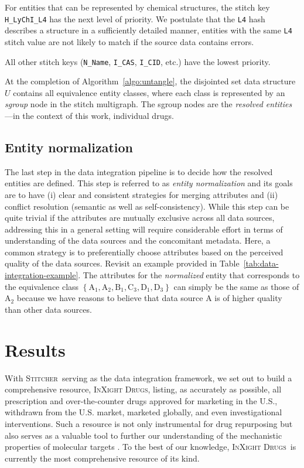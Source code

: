 \documentclass{bmcart}
\newcommand\st{\textsc{Stitcher}}
\newcommand\ix{\textsc{InXight Drugs}}
\begin{document}
For entities that can be represented by chemical structures, the
stitch key \texttt{H\_LyChI\_L4} has the next level of priority. We
postulate that the \texttt{L4} hash describes a structure in a
sufficiently detailed manner, entities with the same \texttt{L4}
stitch value are not likely to match if the source data contains
errors. 

All other stitch keys (\texttt{N\_Name}, \texttt{I\_CAS},
\texttt{I\_CID}, etc.) have the lowest priority.

At the completion of Algorithm~\ref{algo:untangle}, the disjointed set
data structure $U$ contains all equivalence entity classes, where each class 
is represented by an \emph{sgroup} node in the stitch multigraph. 
The sgroup nodes are the \emph{resolved entities}---in the context of
this work, individual drugs.

\subsection*{Entity normalization}
The last step in the data integration pipeline is to decide how the
resolved entities are defined. This step is referred to as \emph{entity
normalization} and its goals are to have (i) clear and consistent
strategies for merging attributes and (ii) conflict resolution
(semantic as well as self-consistency). While this step can be quite
trivial if the attributes are mutually exclusive across all data
sources, addressing this in a general setting will require considerable
effort in terms of understanding of the data sources and the
concomitant metadata. Here, a common strategy is to preferentially
choose attributes based on the perceived quality of the data sources.
Revisit an example provided in Table~\ref{tab:data-integration-example}.
The attributes for the \emph{normalized} entity that corresponds to
the equivalence class $\left\{\textrm{A}_1, \textrm{A}_2, \textrm{B}_1,
\textrm{C}_3, \textrm{D}_1, \textrm{D}_3\right\}$ can simply be the
same as those of $\textrm{A}_2$ because we have reasons to believe
that data source A is of higher quality than other data sources.

\section*{Results}
With \st\ serving as the data integration framework, we set out to
build a comprehensive resource, \ix, listing, as accurately as
possible, all prescription and over-the-counter drugs approved for
marketing in the U.S., withdrawn from the U.S. market, marketed
globally, and even investigational interventions. Such a resource is
not only instrumental for drug repurposing but also serves as a
valuable tool to further our understanding of the mechanistic
properties of molecular targets \cite{Huang2011,Huang2019}. To the
best of our knowledge, \ix\ is currently the most comprehensive
resource of its kind. 
\end{document}
